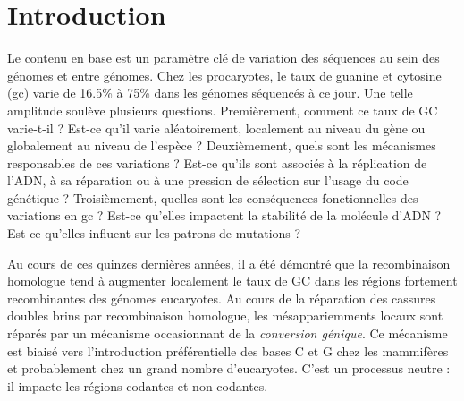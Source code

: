 
\section*{Introduction}
\label{sec:introduction}

Le contenu en base est un paramètre clé de variation des séquences au sein des
génomes et entre génomes. Chez les procaryotes, le taux de guanine et cytosine
(\ac{gc}) varie de 16.5\% à 75\% dans les génomes séquencés à ce jour. Une
telle amplitude soulève plusieurs questions. Premièrement, comment ce taux de
GC varie-t-il ? Est-ce qu'il varie aléatoirement, localement au niveau du gène
ou globalement au niveau de l'espèce ? Deuxièmement, quels sont les mécanismes
responsables de ces variations ? Est-ce qu'ils sont associés à la réplication
de l'ADN, à sa réparation ou à une pression de sélection sur l'usage du code
génétique ?  Troisièmement, quelles sont les conséquences fonctionnelles des
variations en \ac{gc} ? Est-ce qu'elles impactent la stabilité de la molécule
d'ADN ?  Est-ce qu'elles influent sur les patrons de mutations ?

Au cours de ces quinzes dernières années, il a été démontré que la
recombinaison homologue tend à augmenter localement le taux de GC dans les
régions fortement recombinantes des génomes
eucaryotes\cite{duret_biased_2009,lesecque_gc-biased_2013}. Au cours de la
réparation des cassures doubles brins par recombinaison homologue, les
mésappariemments locaux sont réparés par un mécanisme occasionnant de la
\emph{conversion génique}\cite{chen_gene_2007}. Ce mécanisme est biaisé vers
l'introduction préférentielle des bases C et G chez les mammifères et
probablement chez un grand nombre d'eucaryotes\cite{pessia_evidence_2012}.
C'est un processus neutre : il impacte les régions codantes et non-codantes. 
